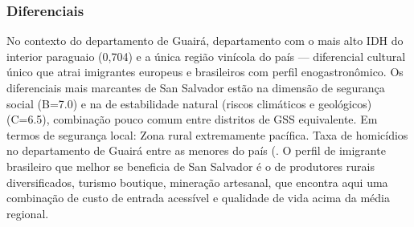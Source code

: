 \subsubsection*{Diferenciais}\label{dif-san-salvador-0414}
No contexto do departamento de Guairá, departamento com o mais alto IDH do interior paraguaio (0,704) e a única região vinícola do país — diferencial cultural único que atrai imigrantes europeus e brasileiros com perfil enogastronômico. Os diferenciais mais marcantes de San Salvador estão na dimensão de segurança social (B=7.0) e na de estabilidade natural (riscos climáticos e geológicos) (C=6.5), combinação pouco comum entre distritos de GSS equivalente. Em termos de segurança local: Zona rural extremamente pacífica. Taxa de homicídios no departamento de Guairá entre as menores do país (. O perfil de imigrante brasileiro que melhor se beneficia de San Salvador é o de produtores rurais diversificados, turismo boutique, mineração artesanal, que encontra aqui uma combinação de custo de entrada acessível e qualidade de vida acima da média regional.
